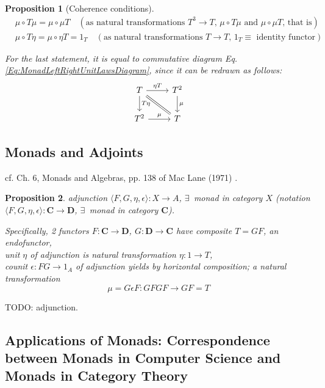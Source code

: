 \documentclass[10pt]{amsart}
\newtheorem{proposition}{Proposition}
\begin{document}
\begin{multicols*}{2}
\begin{proposition}[Coherence conditions]\label{Prop:MonadCoherenceConditions}
	\begin{equation}
	\begin{aligned}
	& \mu \circ T \mu = \mu \circ \mu T \quad (\text{as natural transformations $T^3 \to T$, $\mu \circ T\mu$ and $\mu \circ \mu T$, that is}) \\ 
	& \mu \circ T \eta = \mu \circ \eta T = 1_T \quad (\text{as natural transformations $T \to T$, $1_T \equiv$ identity functor}) 
	\end{aligned}
	\end{equation}
	
	For the last statement, it is equal to commutative diagram Eq. \ref{Eq:MonadLeftRightUnitLawsDiagram}, since it can be redrawn as follows:
\[
\begin{tikzcd}
	T \arrow{d}{ T \eta} \arrow{r}{\eta T} \arrow[equal]{dr} & T^2 \arrow{d}{\mu} \\
	T^2 \arrow{r}{\mu} & T
\end{tikzcd}	
\]
	
\end{proposition}

\subsection{Monads and Adjoints}

cf. Ch. 6, Monads and Algebras, pp. 138 of Mac Lane (1971) \cite{MacL1978}.
\begin{proposition}
	adjunction $\langle F, G, \eta, \epsilon \rangle : X \to A$, $\exists \, $ monad in category $X$ (notation $\langle F,G, \eta, \epsilon \rangle : \mathbf{C} \to \mathbf{D}$, $\exists \, $ monad in category $\mathbf{C}$). 
	
	Specifically, 2 functors $F:\mathbf{C} \to \mathbf{D}$, $G:\mathbf{D} \to \mathbf{C}$ have composite $T = GF$, an endofunctor, \\
	unit $\eta$ of adjunction is natural transformation $\eta : 1 \to T$, \\
	counit $\epsilon :FG \to 1_A$ of adjunction yields by horizontal composition; a natural transformation
	\[
	\mu = G\epsilon F: GFGF \to GF = T
	\] 
\end{proposition}

TODO: adjunction.

\subsection{Applications of Monads: Correspondence between Monads in Computer Science and Monads in Category Theory}


\end{multicols*}
\end{document}
